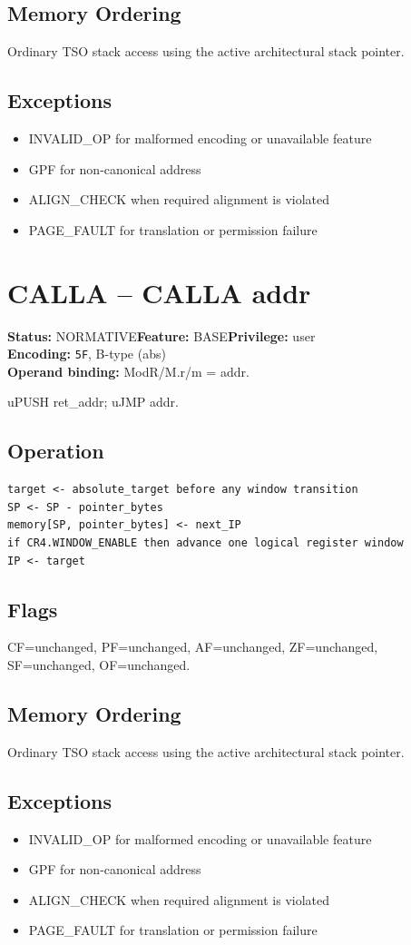 \documentclass[10pt]{article}
\begin{document}
\subsection*{Memory Ordering}
Ordinary TSO stack access using the active architectural stack pointer.
\subsection*{Exceptions}
\begin{itemize}
\item INVALID\_OP for malformed encoding or unavailable feature
\item GPF for non-canonical address
\item ALIGN\_CHECK when required alignment is violated
\item PAGE\_FAULT for translation or permission failure
\end{itemize}
\clearpage

\section{CALLA -- CALLA addr}
\textbf{Status:} NORMATIVE\quad \textbf{Feature:} BASE\quad \textbf{Privilege:} user\\
\textbf{Encoding:} \texttt{5F}, B-type (abs)\\
\textbf{Operand binding:} ModR/M.r/m = addr.

uPUSH ret\_addr; uJMP addr.

\subsection*{Operation}
\begin{lstlisting}
target <- absolute_target before any window transition
SP <- SP - pointer_bytes
memory[SP, pointer_bytes] <- next_IP
if CR4.WINDOW_ENABLE then advance one logical register window
IP <- target
\end{lstlisting}
\subsection*{Flags}
CF=unchanged, PF=unchanged, AF=unchanged, ZF=unchanged, SF=unchanged, OF=unchanged.
\subsection*{Memory Ordering}
Ordinary TSO stack access using the active architectural stack pointer.
\subsection*{Exceptions}
\begin{itemize}
\item INVALID\_OP for malformed encoding or unavailable feature
\item GPF for non-canonical address
\item ALIGN\_CHECK when required alignment is violated
\item PAGE\_FAULT for translation or permission failure
\end{itemize}
\clearpage
\end{document}
